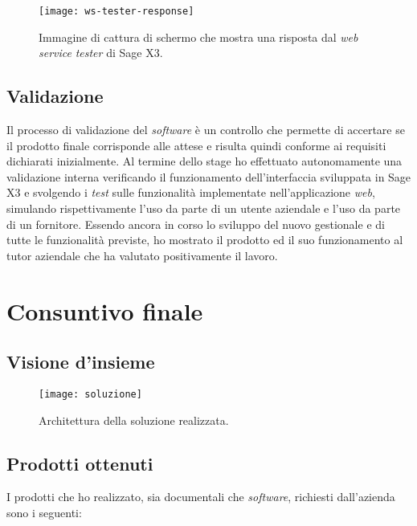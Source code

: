 \begin{figure}[htbp]
	\begin{center}
		\texttt{[image: ws-tester-response]}
		\caption{Immagine di cattura di schermo che mostra una risposta dal \textit{web service} \textit{tester} di Sage X3.}
	\end{center}
\end{figure}

\newpage
\subsection{Validazione}
Il processo di validazione del \textit{software} è un controllo che permette di accertare se il prodotto finale corrisponde alle attese e risulta quindi conforme ai requisiti dichiarati inizialmente.
Al termine dello stage ho effettuato autonomamente una validazione interna verificando il funzionamento dell'interfaccia sviluppata in Sage X3 e svolgendo i \textit{test} sulle funzionalità implementate nell'applicazione \textit{web}, simulando rispettivamente l'uso da parte di un utente aziendale e l'uso da parte di un fornitore.
Essendo ancora in corso lo sviluppo del nuovo gestionale e di tutte le funzionalità previste, ho mostrato il prodotto ed il suo funzionamento al tutor aziendale che ha valutato positivamente il lavoro.



\section{Consuntivo finale}

\subsection{Visione d'insieme}

\begin{figure}[htbp]
	\begin{center}
		\texttt{[image: soluzione]}
		\caption{Architettura della soluzione realizzata.}
	\end{center}
\end{figure}


\subsection{Prodotti ottenuti}

I prodotti che ho realizzato, sia documentali che \textit{software}, richiesti dall'azienda sono i seguenti:

